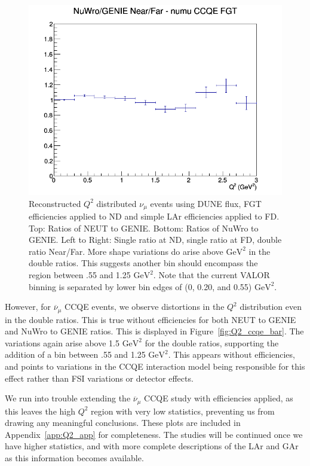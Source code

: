 \documentclass[12pt]{article}
\newcommand{\textapprox}{\raisebox{0.5ex}{\texttildelow}}
\begin{document}
\begin{figure}[h]
\endminipage
{}
\includegraphics[width=\linewidth]{eff_Q2/FGT/ratios/CCQE_NuWro_GENIE_numu_NF_Q2.png}
\endminipage
\caption{Reconstructed $Q^2$ distributed $\nu_{\mu}$ events using DUNE flux, FGT efficiencies applied to ND and simple LAr efficiencies applied to FD. Top: Ratios of NEUT to GENIE. Bottom: Ratios of NuWro to GENIE. Left to Right: Single ratio at ND, single ratio at FD, double ratio Near/Far. More shape variations do arise above \protect\textapprox{1.25} $\textrm{GeV}^2$ in the double ratios. This suggests another bin should encompass the region between .55 and 1.25 $\textrm{GeV}^2$. Note that the current VALOR binning is separated by lower bin edges of (0, 0.20, and 0.55) $\textrm{GeV}^2$.}
\label{fig:Q2_ccqe_FGT_eff}
\end{figure}
\FloatBarrier


However, for $\overline{\nu}_{\mu}$ CCQE events, we observe distortions in the $Q^2$ distribution even in the double ratios. This is true without efficiencies for both NEUT to GENIE and NuWro to GENIE ratios. This is displayed in Figure~\ref{fig:Q2_ccqe_bar}. The variations again arise above 1.5 $\textrm{GeV}^2$ for the double ratios, supporting the addition of a bin between .55 and 1.25 $\textrm{GeV}^2$. This appears without efficiencies, and points to variations in the CCQE interaction model being responsible for this effect rather than FSI variations or detector effects.

We run into trouble extending the $\overline{\nu}_{\mu}$ CCQE study with efficiencies applied, as this leaves the high $Q^2$ region with very low statistics, preventing us from drawing any meaningful conclusions. These plots are included in Appendix~\ref{app:Q2_app} for completeness. The studies will be continued once we have higher statistics, and with more complete descriptions of the LAr and GAr as this information becomes available.
\end{document}
